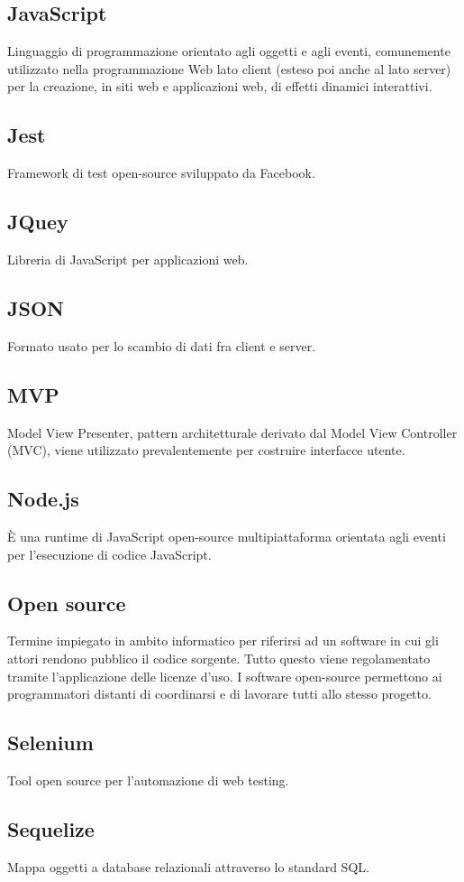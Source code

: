 \documentclass[../manuale_sviluppatore.tex]{subfiles}
\begin{document}
\subsection*{JavaScript}
{}
Linguaggio di programmazione orientato agli oggetti e agli eventi, comunemente utilizzato nella programmazione Web lato client (esteso poi anche al lato server) per la creazione, in siti web e applicazioni web, di effetti dinamici interattivi.

\subsection*{Jest}
{}
Framework di test open-source sviluppato da Facebook.

\subsection*{JQuey}
{}
Libreria di JavaScript per applicazioni web.

\subsection*{JSON}
{}
Formato usato per lo scambio di dati fra client e server.

\subsection*{MVP}
{}
Model View Presenter, pattern architetturale derivato dal Model View Controller (MVC), viene utilizzato prevalentemente per costruire interfacce utente.

\subsection*{Node.js}
{}
È una runtime di JavaScript open-source multipiattaforma orientata agli eventi per l’esecuzione di codice JavaScript.

\subsection*{Open source}
{}
Termine impiegato in ambito informatico per riferirsi ad un software in cui gli attori rendono pubblico il codice sorgente. 
Tutto questo viene regolamentato tramite l’applicazione delle licenze d’uso. 
I software open-source permettono ai programmatori distanti di coordinarsi e di lavorare tutti allo stesso progetto.

\subsection*{Selenium}
{}
Tool open source per l'automazione di web testing.

\subsection*{Sequelize}
{}
Mappa oggetti a database relazionali attraverso lo standard SQL.
\end{document}
